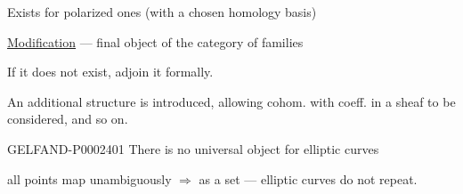 Exists for polarized ones (with a chosen homology basis)



\underline{\underline{Modification}} — final object of the category of families



If it does not exist, adjoin it formally.



An additional structure is introduced, allowing cohom. with coeff. in a sheaf to be considered, and so on.



\begin{GelfandAdjacentEvidence}{GELFAND-P000240}{1}
There is no universal object for elliptic curves




\end{GelfandAdjacentEvidence}

all points map unambiguously $\Rightarrow$ as a set — elliptic curves do not repeat.



